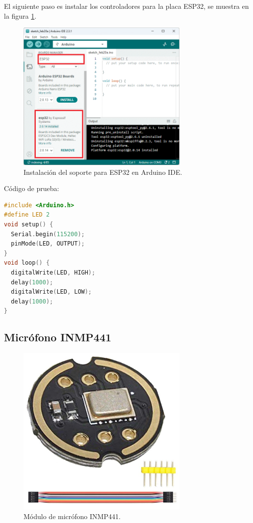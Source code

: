 El siguiente paso es instalar los controladores para la placa ESP32, se muestra en la figura  \ref{fig:arduino_install_esp32}.

\begin{figure}[!ht]
    \centering
    \includegraphics[width=0.75\textwidth]{assets/metodos_herramientas/arduino_install_esp32.png}
    \caption{Instalación del soporte para ESP32 en Arduino IDE.}
    \label{fig:arduino_install_esp32}
\end{figure}

\newpage

Código de prueba:
\begin{lstlisting}[language=C++, label={lst:esp32_blink}, caption={Ejemplo de código de parpadeo de LED en ESP32}]
#include <Arduino.h>
#define LED 2
void setup() {
  Serial.begin(115200);
  pinMode(LED, OUTPUT);
}
void loop() {
  digitalWrite(LED, HIGH);
  delay(1000);
  digitalWrite(LED, LOW);
  delay(1000);
}
\end{lstlisting}

\subsection{Micrófono INMP441}
\begin{figure}[!ht]
    \centering
    \includegraphics[width=0.75\textwidth]{assets/metodos_herramientas/inmp441.png}
    \caption{Módulo de micrófono INMP441.}
    \label{fig:inmp441}
\end{figure}

